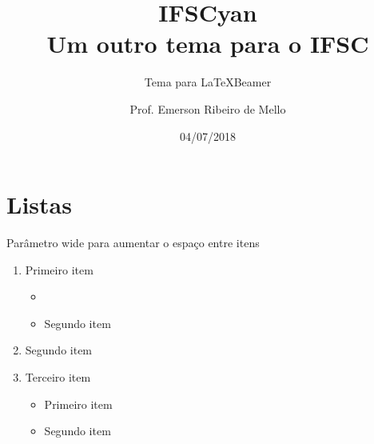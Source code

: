 \documentclass{beamer}
\title{IFSCyan \\ Um outro tema para o IFSC}
\subtitle{Tema para \LaTeX Beamer}
\author{Prof. Emerson Ribeiro de Mello}
\institute{
\href{mello@ifsc.edu.br}{mello@ifsc.edu.br}
}
\date{04/07/2018}
\begin{document}
\begin{frame}[t]
	\maketitle
\end{frame}

\section{Listas}

\begin{frame}[wide]{Parâmetro wide para aumentar o espaço entre itens}
	\begin{enumerate}
		\item Primeiro item
		\begin{itemize}
			\item {}
			\item Segundo item
		\end{itemize}
		\item Segundo item
		\item Terceiro item 
		\begin{itemize}
			\item Primeiro item
			\item Segundo item
		\end{itemize}
	\end{enumerate}
\end{frame}
\end{document}
